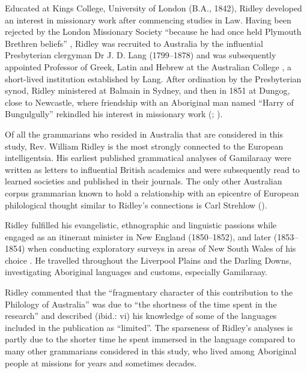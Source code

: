 Educated at Kings College, University of London (B.A., 1842), Ridley developed an interest in missionary work after commencing studies in Law. Having been rejected by the London Missionary Society “because he had once held Plymouth Brethren beliefs” \citep{gunson_australian_2016-1}, Ridley was recruited to Australia by the influential Presbyterian clergyman Dr J. D. Lang (1799--1878) and was subsequently appointed Professor of Greek, Latin and Hebrew at the Australian College \citep[40]{austin_gamilaraay_2008}, a short-lived institution established by Lang. After ordination by the Presbyterian synod, Ridley ministered at Balmain in Sydney, and then in 1851 at Dungog, close to Newcastle, where friendship with an Aboriginal man named “Harry of Bungulgully” rekindled his interest in missionary work (\citealt{gunson_australian_2016-1}; ).

Of all the grammarians who resided in Australia that are considered in this study, Rev. William Ridley is the most strongly connected to the European intelligentsia. His earliest published grammatical analyses of Gamilaraay were written as letters to influential British academics and were subsequently read to learned societies and published in their journals. The only other Australian corpus grammarian known to hold a relationship with an epicentre of European philological thought similar to Ridley’s connections is Carl Strehlow ().

Ridley fulfilled his evangelistic, ethnographic and linguistic passions while engaged as an itinerant minister in New England (1850--1852), and later (1853--1854) when conducting exploratory surveys in areas of New South Wales of his choice \citep[229--230]{harris_one_1994}. He travelled throughout the Liverpool Plains and the Darling Downs, investigating Aboriginal languages and customs, especially Gamilaraay. 

Ridley commented that the “fragmentary character of this contribution to the Philology of Australia” was due to “the shortness of the time spent in the research” \citeyearpar[v]{ridley_kamilaroi_1866} and described (ibid.: vi) his knowledge of some of the languages included in the publication as “limited”. The sparseness of Ridley’s analyses is partly due to the shorter time he spent immersed in the language compared to many other grammarians considered in this study, who lived among Aboriginal people at missions for years and sometimes decades. 

